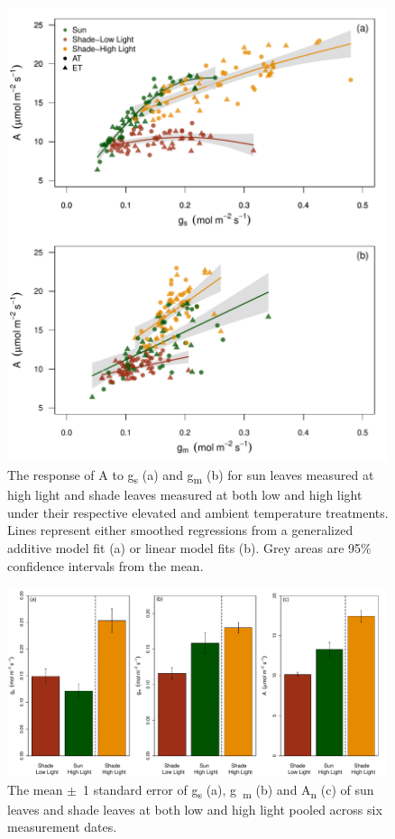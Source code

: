 \documentclass[a4paper]{article}\usepackage[]{graphicx}\usepackage[]{color}
\begin{document}
\begin{figure}[h!]
    \centering
    \includegraphics[width=0.99\textwidth]{Agmgs.pdf}
    \caption{The response of A to g\textsubscript{s} (a) and g\textsubscript{m} (b) for sun leaves measured at high light and shade leaves measured at both low and high light under their respective elevated and ambient temperature treatments. Lines represent either smoothed regressions from a generalized additive model fit (a) or linear model fits (b). Grey areas are 95\% confidence intervals from the mean.}
    \label{fig:figure 3.3}
\end{figure}

\begin{figure}[h!]
    \centering
    \includegraphics[width=0.99\textwidth]{physiology_bar.pdf}
    \caption{The mean $\pm$~1 standard error of g\textsubscript{s} (a), g~\textsubscript{m} (b) and A\textsubscript{n} (c) of sun leaves and shade leaves at both low and high light pooled across six measurement dates.}
    \label{fig:figure 3.4}
\end{figure}
\end{document}
